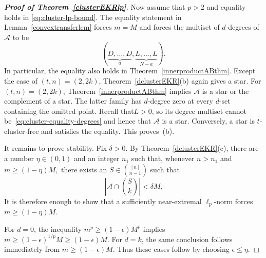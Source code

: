 \documentclass[10pt,a4paper]{amsart}
\numberwithin{equation}{section}
\def\A{\mathcal{A}}
\begin{document}
\begin{proof}[{\bf Proof of Theorem~\ref{clusterEKRlp}}]
	Now assume that $p>2$ and equality holds in
	\eqref{eq:cluster-lp-bound}.
The equality statement in Lemma~\ref{convextransferlem} forces $m=M$ and forces the multiset of $d$-degrees of $\A$ to be
	\begin{equation}\label{eq:cluster-equality-degrees}
		(\underbrace{D,\ldots,D}_{a},
		\underbrace{L,\ldots,L}_{N-a}).
	\end{equation}
In particular, the equality also holds in Theorem~\ref{innerproductABthm}.
Except the case of $(t,n)=(2,2k)$, Theorem~\ref{dclusterEKR}(b) again gives a star.
For $(t,n)=(2,2k)$,
Theorem~\ref{innerproductABthm} implies $\A$ is a star or the complement of a star.
The latter family has $d$-degree zero at every $d$-set containing the omitted point.
Recall that$L>0$,  so its degree multiset cannot be~\eqref{eq:cluster-equality-degrees} and hence that $\A$ is a star.
Conversely, a star is $t$-cluster-free and satisfies the equality.
This proves~(b).

	
It remains to prove stability.
Fix $\delta>0$.
By Theorem~\ref{dclusterEKR}(c), there are a number $\eta\in(0,1)$ and an integer $n_1$ such that, whenever $n>n_1$ and $m\geq(1-\eta)M,$
	there exists an $S\in\binom{[n]}{n-1}$ such that
	\[
	\left|\A\cap\binom Sk\right|<\delta M.
	\]
	It is therefore enough to show that a sufficiently near-extremal
	$\ell_p$-norm forces $m\geq(1-\eta)M$.
	
For $d=0$, the inequality $m^p\geq(1-\epsilon)M^p$ implies
$m\geq(1-\epsilon)^{1/p}M\geq(1-\epsilon)M$.
For $d=k$, the same conclusion follows immediately from
$m\geq(1-\epsilon)M$.
Thus these cases follow by choosing $\epsilon\leq\eta$.
	

\end{proof}
\end{document}
